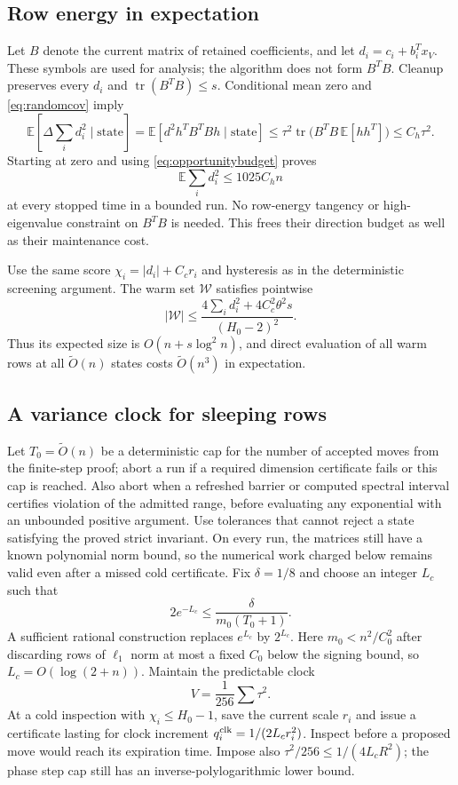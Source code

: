 \documentclass[11pt]{amsart}
\theoremstyle{remark}\newtheorem{remark}[theorem]{Remark}
\begin{document}
\subsection{Row energy in expectation}
Let $B$ denote the current matrix of retained coefficients, and let
$d_i=c_i+b_i^Tx_V$. These symbols are used for analysis; the algorithm
does not form $B^TB$. Cleanup preserves every $d_i$ and
$\operatorname{tr}(B^TB)\le s$. Conditional mean zero and
\eqref{eq:randomcov} imply
\[
 \mathbb E\left[\Delta\sum_i d_i^2\mid\text{state}\right]
 =\mathbb E[d^2 h^TB^TBh\mid\text{state}]
 \le\tau^2\operatorname{tr}\bigl(B^TB\,\mathbb E[hh^T]\bigr)
 \le C_h\tau^2.
\]
Starting at zero and using \eqref{eq:opportunitybudget} proves
\begin{equation}\label{eq:expectedrowenergy}
 \mathbb E\sum_i d_i^2\le1025C_h n
\end{equation}
at every stopped time in a bounded run. No row-energy tangency or
high-eigenvalue constraint on $B^TB$ is needed. This frees their direction
budget as well as their maintenance cost.

Use the same score $\chi_i=|d_i|+C_c r_i$ and hysteresis as in the
deterministic screening argument. The warm set $\mathcal W$ satisfies
pointwise
\[
 |\mathcal W|\le
 \frac{4\sum_i d_i^2+4C_c^2\theta^2s}{(H_0-2)^2}.
\]
Thus its expected size is $O(n+s\log^2 n)$, and direct evaluation of all
warm rows at all $\widetilde O(n)$ states costs
$\widetilde O(n^3)$ in expectation.

\subsection{A variance clock for sleeping rows}
Let $T_0=\widetilde O(n)$ be a deterministic cap for the number of accepted
moves from the finite-step proof; abort a run if a required dimension
certificate fails or this cap is reached. Also abort when a refreshed
barrier or computed spectral interval certifies violation of the admitted
range, before evaluating any exponential with an unbounded positive
argument. Use tolerances that cannot reject a state satisfying the proved
strict invariant. On every run, the matrices still have a known
polynomial norm bound, so the numerical work charged below remains valid
even after a missed cold certificate. Fix $\delta=1/8$ and choose
an integer $L_c$ such that
\[
 2e^{-L_c}\le\frac{\delta}{m_0(T_0+1)}.
\]
A sufficient rational construction replaces $e^{L_c}$ by $2^{L_c}$.
Here $m_0<n^2/C_0^2$ after discarding rows of $\ell_1$ norm at most a
fixed $C_0$ below the signing bound, so $L_c=O(\log(2+n))$.
Maintain the predictable clock
\[
 V=\frac1{256}\sum\tau^2.
\]
At a cold inspection with $\chi_i\le H_0-1$, save the current scale $r_i$
and issue a certificate lasting for clock increment
$q_i^{\rm clk}=1/(2L_c r_i^2)$.
Inspect before a proposed move would reach its expiration time. Impose
also $\tau^2/256\le1/(4L_cR^2)$; the phase step cap still has an
inverse-polylogarithmic lower bound.
\end{document}

